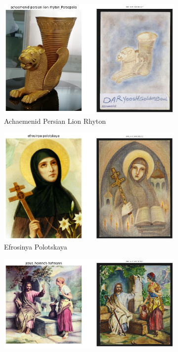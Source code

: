 \begin{figure}
     \centering
     \begin{subfigure}[b]{0.45\textwidth}
         \centering
         \includegraphics[width=\textwidth]{images/example_pairs/achaemenid-persian-lion-rhyton_Persepolis.png}
         \caption{Achaemenid Persian Lion Rhyton}
     \end{subfigure}
     \hfil
     \begin{subfigure}[b]{0.45\textwidth}
         \centering
         \includegraphics[width=\textwidth]{images/example_pairs/efrosinya-polotskaya.png}
         \caption{Efrosinya Polotskaya}
     \end{subfigure}
     \hfil
     \begin{subfigure}[b]{0.45\textwidth}
         \centering
         \includegraphics[width=\textwidth]{images/example_pairs/jesus_heinrich-hofmann.png}

\end{subfigure}
\end{figure}
